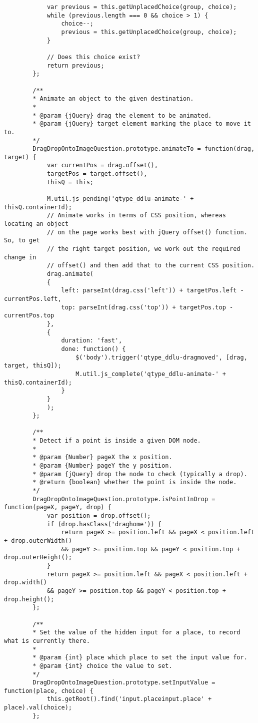 \begin{lstlisting}
			var previous = this.getUnplacedChoice(group, choice);
			while (previous.length === 0 && choice > 1) {
				choice--;
				previous = this.getUnplacedChoice(group, choice);
			}
			
			// Does this choice exist?
			return previous;
		};
		
		/**
		* Animate an object to the given destination.
		*
		* @param {jQuery} drag the element to be animated.
		* @param {jQuery} target element marking the place to move it to.
		*/
		DragDropOntoImageQuestion.prototype.animateTo = function(drag, target) {
			var currentPos = drag.offset(),
			targetPos = target.offset(),
			thisQ = this;
			
			M.util.js_pending('qtype_ddlu-animate-' + thisQ.containerId);
			// Animate works in terms of CSS position, whereas locating an object
			// on the page works best with jQuery offset() function. So, to get
			// the right target position, we work out the required change in
			// offset() and then add that to the current CSS position.
			drag.animate(
			{
				left: parseInt(drag.css('left')) + targetPos.left - currentPos.left,
				top: parseInt(drag.css('top')) + targetPos.top - currentPos.top
			},
			{
				duration: 'fast',
				done: function() {
					$('body').trigger('qtype_ddlu-dragmoved', [drag, target, thisQ]);
					M.util.js_complete('qtype_ddlu-animate-' + thisQ.containerId);
				}
			}
			);
		};
		
		/**
		* Detect if a point is inside a given DOM node.
		*
		* @param {Number} pageX the x position.
		* @param {Number} pageY the y position.
		* @param {jQuery} drop the node to check (typically a drop).
		* @return {boolean} whether the point is inside the node.
		*/
		DragDropOntoImageQuestion.prototype.isPointInDrop = function(pageX, pageY, drop) {
			var position = drop.offset();
			if (drop.hasClass('draghome')) {
				return pageX >= position.left && pageX < position.left + drop.outerWidth()
				&& pageY >= position.top && pageY < position.top + drop.outerHeight();
			}
			return pageX >= position.left && pageX < position.left + drop.width()
			&& pageY >= position.top && pageY < position.top + drop.height();
		};
		
		/**
		* Set the value of the hidden input for a place, to record what is currently there.
		*
		* @param {int} place which place to set the input value for.
		* @param {int} choice the value to set.
		*/
		DragDropOntoImageQuestion.prototype.setInputValue = function(place, choice) {
			this.getRoot().find('input.placeinput.place' + place).val(choice);
		};
		

\end{lstlisting}
